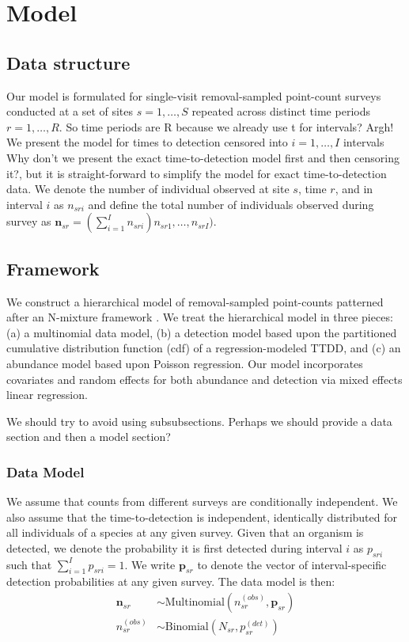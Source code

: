 \documentclass[useAMS,usenatbib,referee,12pt]{article}
\newcommand{\jarad}[1]{{\color{red} #1}}
\newcommand{\vn}{\textbf{n}}
\begin{document}
\section{Model}\label{sec:model}

\subsection{Data structure}\label{sec:data}

Our model is formulated for single-visit removal-sampled point-count surveys conducted at a set of sites $s=1,\dotso,S$ repeated across distinct time periods $r=1,\dotso,R$. \jarad{So time periods are R because we already use t for intervals? Argh!}  We present the model for times to detection censored into $i=1,\dotso,I$ intervals \jarad{Why don't we present the exact time-to-detection model first and then censoring it?}, but it is straight-forward to simplify the model for exact time-to-detection data.  
We denote the number of individual observed at site $s$, time $r$, and in interval $i$ as $n_{sri}$ and define the total number of individuals observed during survey as $\vn_{sr} = (\sum_{i=1}^I n_{sri})n_{sr1},\ldots,n_{srI})$.


\subsection{Framework}

We construct a hierarchical model of removal-sampled point-counts patterned after an N-mixture framework \citep{Wyatt2002, Royle2004NMixture}.  We treat the hierarchical model in three pieces: (a) a multinomial data model, (b) a detection model based upon the partitioned cumulative distribution function (cdf) of a regression-modeled TTDD, and (c) an abundance model based upon Poisson regression.  Our model incorporates covariates and random effects for both abundance and detection via mixed effects linear regression.

\jarad{We should try to avoid using subsubsections. Perhaps we should provide a data section and then a model section?}

\subsubsection{Data Model}
We assume that counts from different surveys are conditionally independent.  We also assume that the time-to-detection is independent, identically distributed for all individuals of a species at any given survey.  Given that an organism is detected, we denote the probability it is first detected during interval $i$ as $p_{sri}$ such that $\sum_{i=1}^I p_{sri} = 1$.  We write $\textbf{p}_{sr}$ to denote the vector of interval-specific detection probabilities at any given survey.  The data model is then:
\begin{align}\label{eq:datamodel}
\vn_{sr} &\sim \mbox{Multinomial}\left(n_{sr}^{(obs)}, \textbf{p}_{sr}\right)\\
n_{sr}^{(obs)} &\sim \mbox{Binomial}\left(N_{sr}, p_{sr}^{(det)}\right)
\end{align}
\end{document}
